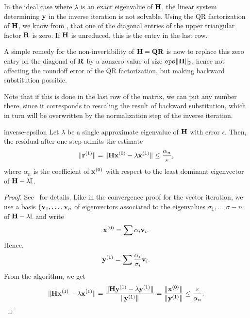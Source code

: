\begin{remark}
  In the ideal case where $\lambda$ is an exact eigenvalue of $\mathbf H$,
  the linear system determining $\mathbf y$ in the inverse iteration is not
  solvable. Using the QR factorization of $\mathbf H$, we know from
  , that one of the diagonal entries of
  the upper triangular factor $\mathbf R$ is zero. If $\mathbf H$ is
  unreduced, this is the entry in the last row.

  A simple remedy for the non-invertibility of $\mathbf H = \mathbf Q\mathbf R$ is
  now to replace this zero entry on the diagonal of $\mathbf R$ by a
  zonzero value of size $\texttt{eps} \lVert\mathbf H\rVert_2$, hence not affecting the
  roundoff error of the QR factorization, but making backward
  substitution possible.

  Note that if this is done in the last row of the matrix, we can put
  any number there, since it corresponds to rescaling the result of
  backward substitution, which in turn will be overwritten by the
  normalization step of the inverse iteration.
\end{remark}

\begin{Lemma}{inverse-epsilon}
  Let $\lambda$ be a single approximate eigenvalue of $\mathbf H$ with
  error $\epsilon$. Then, the residual after one step admits the estimate
  \begin{gather}
    \lVert\mathbf r^{(1)}\rVert = \lVert\mathbf H\mathbf x^{(0)} - \lambda\mathbf x^{(1)}\rVert \le \frac{\alpha_n}{\varepsilon},
  \end{gather}
  where $\alpha_n$ is the coefficient of $\mathbf x^{(0)}$ with respect to the
least dominant eigenvector of $\mathbf H-\lambda\mathbb I$.
\end{Lemma}

\begin{proof}
  See~\cite{PetersWilkinson79} for details. Like in the convergence
  proof for the vector iteration, we use a basis $\{\mathbf v_1,\dots,\mathbf v_n$
  of eigenvectors associated to the eigenvalues
  $\sigma_1,\dots,\sigma-n$ of $\mathbf H-\lambda\mathbb I$ and write
  \begin{gather}
    \mathbf x^{(0)} = \sum \alpha_i\mathbf v_i.
  \end{gather}
  Hence,
  \begin{gather}
    \mathbf y^{(1)} = \sum \frac{\alpha_i}{\sigma_i} \mathbf v_i.
  \end{gather}
  From the algorithm, we get
  \begin{gather}
    \lVert\mathbf H\mathbf x^{(1)}-\lambda\mathbf x^{(1)}\rVert
    = \frac{\lVert\mathbf H\mathbf y^{(1)}-\lambda\mathbf y^{(1)}\rVert}{\lVert\mathbf y^{(1)}\rVert}
    = \frac{\lVert\mathbf x^{(0)}\rVert}{\lVert\mathbf y^{(1)}\rVert} \le \frac{\varepsilon}{\alpha_n}.
  \end{gather}
\end{proof}


